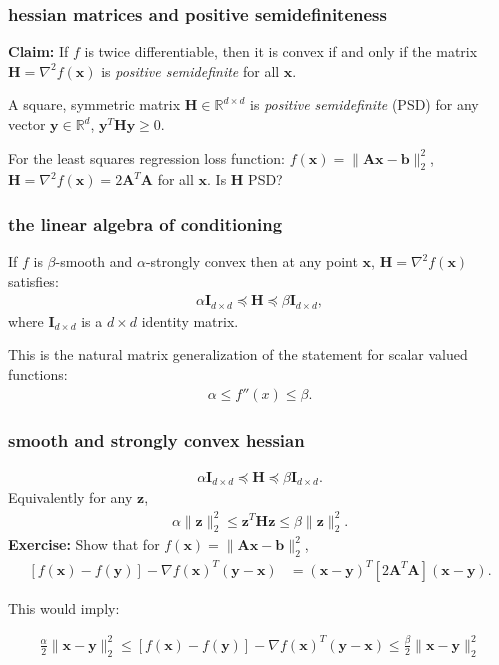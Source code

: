 \documentclass[compress]{beamer}
\newcommand{\bv}[1]{\mathbf{#1}}
\newcommand{\R}{\mathbb{R}}
\begin{document}
\begin{frame}[t]
	\frametitle{hessian matrices and positive semidefiniteness}
	\textbf{Claim:} If $f$ is twice differentiable, then it is convex if and only if the matrix $\bv{H} = \nabla^2 f(\bv{x})$ is \emph{positive semidefinite} for all $\bv{x}$. 
	
	\begin{definition}
		A square, symmetric matrix $\bv{H}\in \R^{d\times d}$ is \emph{positive semidefinite} (PSD) for any vector $\bv{y}\in \R^d$, $\bv{y}^T\bv{H}\bv{y} \geq 0$. 
	\end{definition}

	For the least squares regression loss function: $f(\bv{x}) = \|\bv{A}\bv{x} - \bv{b}\|_2^2$, $\bv{H} = \nabla^2 f(\bv{x})= 2\bv{A}^T\bv{A}$ for all $\bv{x}$. Is $\bv{H}$ PSD?
\end{frame}

\begin{frame}[t]
	\frametitle{the linear algebra of conditioning}
	If $f$ is $\beta$-smooth and $\alpha$-strongly convex then at any point $\bv{x}$, $\bv{H} = \nabla^2 f(\bv{x})$ satisfies: 
	\begin{align*}
		\alpha\bv{I}_{d\times d} \preceq \bv{H} \preceq \beta\bv{I}_{d\times d},
	\end{align*}
where $\bv{I}_{d\times d}$ is a $d\times d$ identity matrix. 
	
	This is the natural matrix generalization of the statement for scalar valued functions:
	\begin{align*}
	\alpha \leq f''(x)\leq \beta.
	\end{align*}

\end{frame}

\begin{frame}[t]
	\frametitle{smooth and strongly convex hessian}
	\begin{align*}
		\alpha\bv{I}_{d\times d} \preceq \bv{H} \preceq \beta\bv{I}_{d\times d}.
	\end{align*}
Equivalently for any $\bv{z}$,
\begin{align*}
	\alpha\|\bv{z}\|_2^2 \leq \bv{z}^T\bv{H}\bv{z} \leq \beta\|\bv{z}\|_2^2.
\end{align*} 
	\textbf{Exercise:} Show that for $f(\bv{x}) = \|\bv{A}\bv{x} - \bv{b}\|_2^2$,
	\begin{align*}
		\left[f(\bv{x}) - f(\bv{y})\right] - \nabla f(\bv{x})^T(\bv{y} - \bv{x})  &= (\bv{x}-\bv{y})^T\left[2\bv{A}^T\bv{A}\right](\bv{x}-\bv{y}).
	\end{align*}

This would imply:

	\begin{align*}
	\frac{\alpha}{2} \|\bv{x}-\bv{y}\|_2^2 \leq \left[f(\bv{x}) - f(\bv{y})\right] - \nabla f(\bv{x})^T(\bv{y} - \bv{x})  \leq \frac{\beta}{2}\|\bv{x}-\bv{y}\|_2^2
	\end{align*}
\end{frame}
\end{document}
